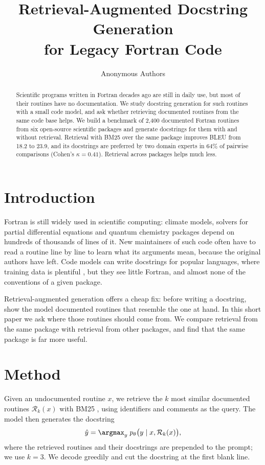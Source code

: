 \documentclass{article}
\title{Retrieval-Augmented Docstring Generation \\ for Legacy Fortran Code}
\author{Anonymous Authors}
\begin{document}
\maketitle

\begin{abstract}
Scientific programs written in Fortran decades ago are still in daily use, but most of their routines have no documentation.
We study docstring generation for such routines with a small code model, and ask whether retrieving documented routines from the same code base helps.
We build a benchmark of 2,400 documented Fortran routines from six open-source scientific packages and generate docstrings for them with and without retrieval.
Retrieval with BM25 over the same package improves BLEU from 18.2 to 23.9, and its docstrings are preferred by two domain experts in 64\% of pairwise comparisons (Cohen's $\kappa = 0.41$).
Retrieval across packages helps much less.
\end{abstract}

\section{Introduction}
\label{sec:intro}

Fortran is still widely used in scientific computing: climate models, solvers for partial differential equations and quantum chemistry packages depend on hundreds of thousands of lines of it.
New maintainers of such code often have to read a routine line by line to learn what its arguments mean, because the original authors have left.
Code models can write docstrings for popular languages, where training data is plentiful \citep{husain2019codesearchnet}, but they see little Fortran, and almost none of the conventions of a given package.

Retrieval-augmented generation \citep{lewis2020retrieval} offers a cheap fix: before writing a docstring, show the model documented routines that resemble the one at hand.
In this short paper we ask where those routines should come from.
We compare retrieval from the same package with retrieval from other packages, and find that the same package is far more useful.

\section{Method}
\label{sec:method}

Given an undocumented routine $x$, we retrieve the $k$ most similar documented routines $\mathcal{R}_k(x)$ with BM25 \citep{robertson2009probabilistic}, using identifiers and comments as the query.
The model then generates the docstring
\begin{equation}
\hat{y} = \argmax_{y} \; p_\theta\bigl(y \mid x, \mathcal{R}_k(x)\bigr),
\label{eq:rag}
\end{equation}
where the retrieved routines and their docstrings are prepended to the prompt; we use $k = 3$. %
We decode greedily and cut the docstring at the first blank line.
\end{document}
